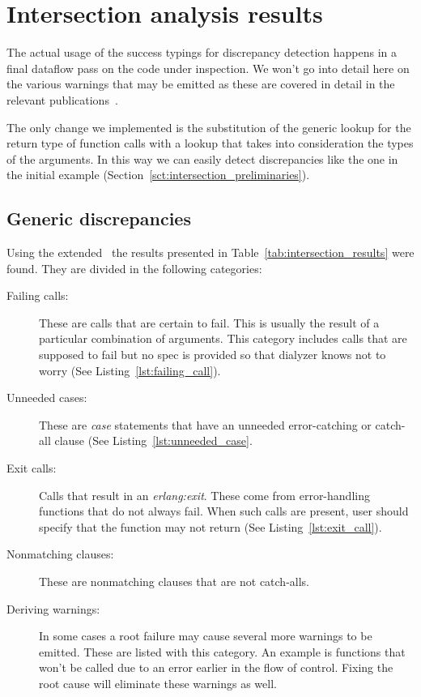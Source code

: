 \section{Intersection analysis results}

The actual usage of the success typings for discrepancy detection
happens in a final dataflow pass on the code under inspection. We
won't go into detail here on the various warnings that may be emitted
as these are covered in detail in the relevant
publications~\cite{Elli, SuccessTypings@PPDP-06,
  springerlink:10.1007/978-3-540-30477-7_7}.

The only change we implemented is the substitution of the
generic lookup for the return type of function calls with a lookup
that takes into consideration the types of the arguments. In this way
we can easily detect discrepancies like the one in the initial example
(Section~\ref{sct:intersection_preliminaries}).

\subsection{Generic discrepancies}

Using the extended \dr\ the results presented in
Table~\ref{tab:intersection_results} were found. They are divided in
the following categories:

\begin{description}
\item[Failing calls:] These are calls that are certain to fail. This
  is usually the result of a particular combination of arguments. This
  category includes calls that are supposed to fail but no spec is
  provided so that dialyzer knows not to worry (See
  Listing~\ref{lst:failing_call}).
\item[Unneeded cases:] These are \emph{case} statements that have an
  unneeded error-catching or catch-all clause (See
  Listing~\ref{lst:unneeded_case}.
\item[Exit calls:] Calls that result in an \emph{erlang:exit}. These
  come from error-handling functions that do not always fail. When
  such calls are present, user should specify that the function may
  not return (See Listing~\ref{lst:exit_call}). 
\item[Nonmatching clauses:] These are nonmatching clauses that are not
  catch-alls.
\item[Deriving warnings:] In some cases a root failure may cause
  several more warnings to be emitted. These are listed with this
  category. An example is functions that won't be called due to an
  error earlier in the flow of control. Fixing the root cause will
  eliminate these warnings as well.
\end{description}

